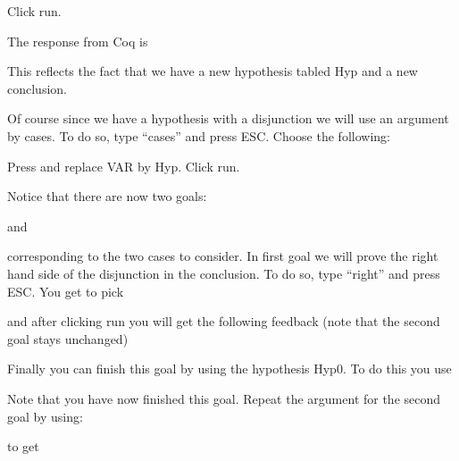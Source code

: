 \noindent
{}

Click run.

The response from Coq is


This reflects the fact that we have a new hypothesis tabled Hyp  and a new conclusion.

Of course since we have a hypothesis with a disjunction we will use an argument by cases. To do so, type ``cases'' and press ESC. Choose the following:

Press \VAR and replace VAR by Hyp. Click run.

Notice that there are now two goals:

and 


corresponding to the two cases to consider. In first goal we will prove the right hand side of the disjunction in the conclusion. To do so, type ``right'' and press ESC. You get to pick


and after clicking run you will get the following feedback (note that the second goal stays unchanged)


Finally you can finish this goal by using the hypothesis Hyp0. To do this you use

Note that you have now finished this goal. Repeat the argument for the second goal by using:


to get 

